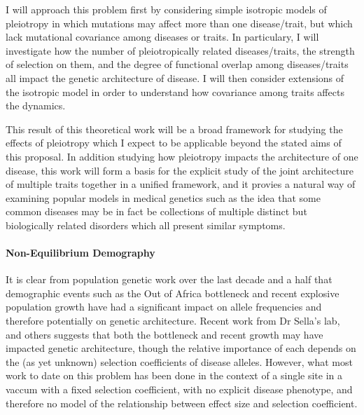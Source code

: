\documentclass[11pt]{article}
\begin{document}
I will approach this problem first by considering simple isotropic models of pleiotropy in which mutations may affect more than one disease/trait, but which lack mutational covariance among diseases or traits. In particulary, I will investigate how the number of pleiotropically related diseases/traits, the strength of selection on them, and the degree of functional overlap among diseases/traits all impact the genetic architecture of disease. I will then consider extensions of the isotropic model in order to understand how covariance among traits affects the dynamics.

This result of this theoretical work will be a broad framework for studying the effects of pleiotropy which I expect to be applicable beyond the stated aims of this proposal. In addition studying how pleiotropy impacts the architecture of one disease, this work will form a basis for the explicit study of the joint architecture of multiple traits together in a unified framework, and it provies a natural way of examining popular models in medical genetics such as the idea that some common diseases may be in fact be collections of multiple distinct but biologically related disorders which all present similar symptoms. 

\paragraph{Non-Equilibrium Demography}

It is clear from population genetic work over the last decade and a half that demographic events such as the Out of Africa bottleneck and recent explosive population growth have had a significant impact on allele frequencies and therefore potentially on genetic architecture. Recent work from Dr Sella's lab\cite{Simons:2014fj}, and others\cite{Gao:2014dz, Gazave:2013jh, Lohmueller:2014gd} suggests that both the bottleneck and recent growth may have impacted genetic architecture, though the relative importance of each depends on the (as yet unknown) selection coefficients of disease alleles. However, what most work to date on this problem has been done in the context of a single site in a vaccum with a fixed selection coefficient, with no explicit disease phenotype, and therefore no model of the relationship between effect size and selection coefficient.
\end{document}
